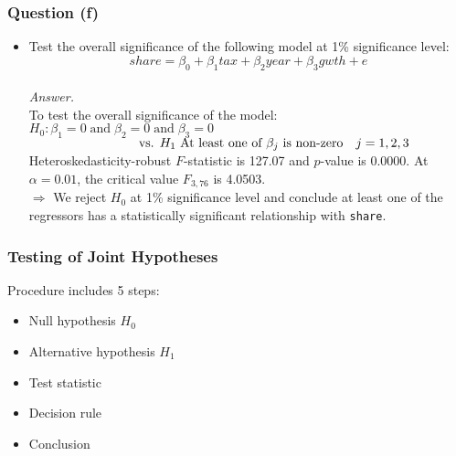 \documentclass[11pt, xcolor=x11names,compress]{beamer}
\begin{document}
\begin{frame}
\frametitle{Question (f)}
\begin{itemize}
    \item Test the overall significance of the following model at 1\% significance level:
$$share = \beta_0 + \beta_1tax + \beta_2year + \beta_3 gwth + e$$\\
    \pause
    \vspace{3mm}
    \textit{Answer.}\\
    To test the overall significance of the model:\\
    \vspace{3mm}
    $H_0: \beta_1 = 0 \; \text{and} \; \beta_2 = 0 \; \text{and}\; \beta_3 = 0$\\
    $\hspace{30mm}\text{vs. $H_1$ At least one of  }\beta_j \text{ is non-zero} \quad j=1,2,3$\\
    \vspace{3mm}
    Heteroskedasticity-robust $F$-statistic is 127.07 and $p$-value is 0.0000. At  $\alpha=0.01$, the critical value $F_{3,76}$ is 4.0503.\\
    \vspace{3mm}
    $\Rightarrow$ We reject $H_0$ at 1\% significance level and conclude at least one of the regressors has a statistically significant relationship with \texttt{share}. \end{itemize}
\end{frame}
\begin{frame}[fragile,t]
\linespread{1.3}
\frametitle{Testing of Joint Hypotheses}\label{Joint Hypotheses}

Procedure includes 5 steps:
\begin{itemize}
    \item Null hypothesis $H_0$
    \item Alternative hypothesis $H_1$
    \item Test statistic
    \item Decision rule
    \item Conclusion
\end{itemize}

\end{frame}
\end{document}
